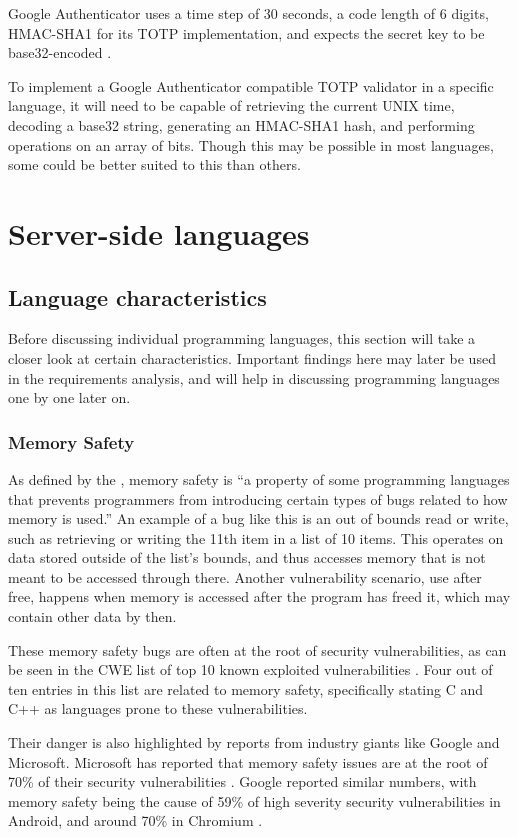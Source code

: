 Google Authenticator uses a time step of 30 seconds, a code length of 6 digits, HMAC-SHA1 for its TOTP implementation, and expects the secret key to be base32-encoded \autocite{GoogleKeyUri}.

To implement a Google Authenticator compatible TOTP validator in a specific language, it will need to be capable of retrieving the current UNIX time, decoding a base32 string, generating an HMAC-SHA1 hash, and performing operations on an array of bits. Though this may be possible in most languages, some could be better suited to this than others.

\section{Server-side languages}
\subsection{Language characteristics}
Before discussing individual programming languages, this section will take a closer look at certain characteristics. Important findings here may later be used in the requirements analysis, and will help in discussing programming languages one by one later on.
\subsubsection{Memory Safety}
As defined by the \textcite{Prossimo2021}, memory safety is “a property of some programming languages that prevents programmers from introducing certain types of bugs related to how memory is used.” An example of a bug like this is an out of bounds read or write, such as retrieving or writing the 11th item in a list of 10 items. This operates on data stored outside of the list's bounds, and thus accesses memory that is not meant to be accessed through there. Another vulnerability scenario, use after free, happens when memory is accessed after the program has freed it, which may contain other data by then.

These memory safety bugs are often at the root of security vulnerabilities, as can be seen in the CWE list of top 10 known exploited vulnerabilities \autocite{CWE2023}. Four out of ten entries in this list are related to memory safety, specifically stating C and C++ as languages prone to these vulnerabilities.

Their danger is also highlighted by reports from industry giants like Google and Microsoft. Microsoft has reported that memory safety issues are at the root of 70\% of their security vulnerabilities \autocite{Thomas2021}. Google reported similar numbers, with memory safety being the cause of 59\% of high severity security vulnerabilities in Android, and around 70\% in Chromium \autocite{ChromiumSecurity,Deus2021}.

